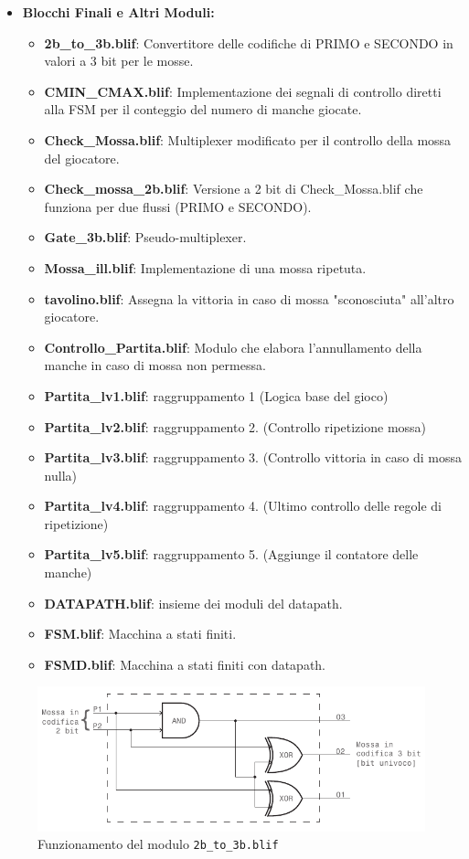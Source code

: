 \documentclass[a4paper]{report}
\begin{document}
  \begin{itemize}\small
    \item \textbf{Blocchi Finali e Altri Moduli:}
    \begin{itemize}
        \item \textbf{2b\_to\_3b.blif}: Convertitore delle codifiche di PRIMO e SECONDO in valori a 3 bit per le mosse.
        \item \textbf{CMIN\_CMAX.blif}: Implementazione dei segnali di controllo diretti alla FSM per il conteggio del numero di manche giocate.
        \item \textbf{Check\_Mossa.blif}: Multiplexer modificato per il controllo della mossa del giocatore.
        \item \textbf{Check\_mossa\_2b.blif}: Versione a 2 bit di Check\_Mossa.blif che funziona per due flussi (PRIMO e SECONDO).
        \item \textbf{Gate\_3b.blif}: Pseudo-multiplexer.
        \item \textbf{Mossa\_ill.blif}: Implementazione di una mossa ripetuta.
        \item \textbf{tavolino.blif}: Assegna la vittoria in caso di mossa "sconosciuta" all'altro giocatore.
        \item \textbf{Controllo\_Partita.blif}: Modulo che elabora l'annullamento della manche in caso di mossa non permessa.
        \item \textbf{Partita\_lv1.blif}: raggruppamento 1 (Logica base del gioco)
        \item \textbf{Partita\_lv2.blif}: raggruppamento 2. (Controllo ripetizione mossa)
        \item \textbf{Partita\_lv3.blif}: raggruppamento 3. (Controllo vittoria in caso di mossa nulla)
        \item \textbf{Partita\_lv4.blif}: raggruppamento 4. (Ultimo controllo delle regole di ripetizione)
        \item \textbf{Partita\_lv5.blif}: raggruppamento 5. (Aggiunge il contatore delle manche)
        \item \textbf{DATAPATH.blif}: insieme dei moduli del datapath.
        \item \textbf{FSM.blif}: Macchina a stati finiti.
        \item \textbf{FSMD.blif}: Macchina a stati finiti con datapath.
    \end{itemize}
\end{itemize}

\begin{figure}[h]
  \centering
  \includegraphics[scale=1]{3bmosse.pdf}
  \caption{Funzionamento del modulo \texttt{2b\_to\_3b.blif}}
  \label{img:3bmosse}
\end{figure}
\end{document}
